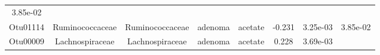 \documentclass[11pt,]{article}
\begin{document}
\begin{longtable}[]{@{}cccccccc@{}}
\begin{minipage}[t]{0.08\columnwidth}
3.85e-02\strut
\end{minipage}\tabularnewline
\begin{minipage}[t]{0.08\columnwidth}\centering\strut
Otu01114\strut
\end{minipage} & \begin{minipage}[t]{0.15\columnwidth}\centering\strut
Ruminococcaceae\strut
\end{minipage} & \begin{minipage}[t]{0.15\columnwidth}\centering\strut
Ruminococcaceae\strut
\end{minipage} & \begin{minipage}[t]{0.08\columnwidth}\centering\strut
adenoma\strut
\end{minipage} & \begin{minipage}[t]{0.09\columnwidth}\centering\strut
acetate\strut
\end{minipage} & \begin{minipage}[t]{0.07\columnwidth}\centering\strut
-0.231\strut
\end{minipage} & \begin{minipage}[t]{0.08\columnwidth}\centering\strut
3.25e-03\strut
\end{minipage} & \begin{minipage}[t]{0.08\columnwidth}\centering\strut
3.85e-02\strut
\end{minipage}\tabularnewline
\begin{minipage}[t]{0.08\columnwidth}\centering\strut
Otu00009\strut
\end{minipage} & \begin{minipage}[t]{0.15\columnwidth}\centering\strut
Lachnospiraceae\strut
\end{minipage} & \begin{minipage}[t]{0.15\columnwidth}\centering\strut
Lachnospiraceae\strut
\end{minipage} & \begin{minipage}[t]{0.08\columnwidth}\centering\strut
adenoma\strut
\end{minipage} & \begin{minipage}[t]{0.09\columnwidth}\centering\strut
acetate\strut
\end{minipage} & \begin{minipage}[t]{0.07\columnwidth}\centering\strut
0.228\strut
\end{minipage} & \begin{minipage}[t]{0.08\columnwidth}\centering\strut
3.69e-03\strut
\end{minipage} & \begin{minipage}[t]{0.08\columnwidth}\centering\strut

\end{minipage}
\end{longtable}
\end{document}
